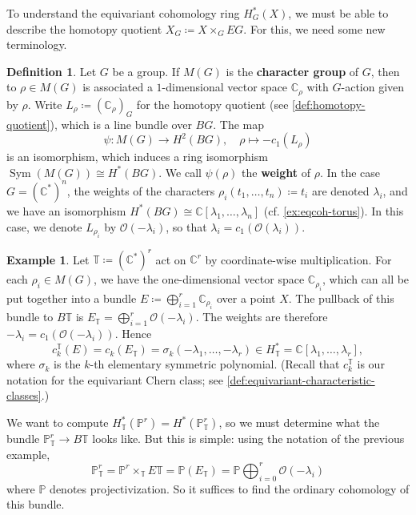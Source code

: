 \documentclass{report}
\theoremstyle{plain}
\theoremstyle{definition}
\newtheorem{definition}[theorem]{Definition}
\newtheorem{example}[theorem]{Example}
\theoremstyle{remark}
\newcommand{\bC}{\mathbb{C}}
\newcommand{\bT}{\mathbb{T}}
\newcommand{\bP}{\mathbb{P}}
\newcommand{\cO}{\mathcal{O}}
\DeclareMathOperator{\Sym}{Sym}
\begin{document}
To understand the equivariant cohomology ring $H^*_G(X)$, we must be
able to describe the homotopy quotient $X_G \coloneqq X \times_G EG$.
For this, we need some new terminology.

\begin{definition}
  Let $G$ be a group. If $M(G)$ is the {\bf character group} of $G$,
  then to $\rho \in M(G)$ is associated a $1$-dimensional vector space
  $\bC_\rho$ with $G$-action given by $\rho$. Write $L_\rho \coloneqq
  (\bC_\rho)_G$ for the homotopy quotient (see
  \ref{def:homotopy-quotient}), which is a line bundle over $BG$. The
  map
  \[ \psi\colon M(G) \to H^2(BG), \quad \rho \mapsto -c_1(L_\rho) \]
  is an isomorphism, which induces a ring isomorphism $\Sym(M(G))
  \cong H^*(BG)$. We call $\psi(\rho)$ the {\bf weight} of $\rho$. In
  the case $G = (\bC^*)^n$, the weights of the characters $\rho_i(t_1,
  \ldots, t_n) \coloneqq t_i$ are denoted $\lambda_i$, and we have an
  isomorphism $H^*(BG) \cong \bC[\lambda_1, \ldots, \lambda_n]$ (cf.
  \ref{ex:eqcoh-torus}). In this case, we denote $L_{\rho_i}$ by
  $\cO(-\lambda_i)$, so that $\lambda_i = c_1(\cO(\lambda_i))$.
\end{definition}

\begin{example}
  Let $\bT \coloneqq (\bC^*)^r$ act on $\bC^r$ by coordinate-wise
  multiplication. For each $\rho_i \in M(G)$, we have the
  one-dimensional vector space $\bC_{\rho_i}$, which can all be put
  together into a bundle $E \coloneqq \bigoplus_{i=1}^r \bC_{\rho_i}$
  over a point $X$. The pullback of this bundle to $B\bT$ is $E_{\bT}
  = \bigoplus_{i=1}^r \cO(-\lambda_i)$. The weights are therefore
  $-\lambda_i = c_1(\cO(-\lambda_i))$. Hence
  \begin{equation} \label{eq:chern-classes-universal-subbundle}
    c_k^{\bT}(E) = c_k(E_{\bT}) = \sigma_k(-\lambda_1, \ldots, -\lambda_r) \in H^*_{\bT} = \bC[\lambda_1, \ldots, \lambda_r],
  \end{equation}
  where $\sigma_k$ is the $k$-th elementary symmetric polynomial.
  (Recall that $c_k^{\bT}$ is our notation for the equivariant Chern
  class; see \ref{def:equivariant-characteristic-classes}.)
\end{example}

We want to compute $H^*_{\bT}(\bP^r) = H^*(\bP^r_{\bT})$, so we must
determine what the bundle $\bP^r_{\bT} \to B\bT$ looks like. But this
is simple: using the notation of the previous example,
\[ \bP^r_{\bT} = \bP^r \times_{\bT} E\bT = \bP(E_{\bT}) = \bP\bigoplus_{i=0}^r \cO(-\lambda_i) \]
where $\bP$ denotes projectivization. So it suffices to find the
ordinary cohomology of this bundle.
\end{document}
